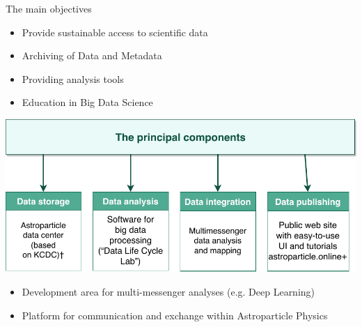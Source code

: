 

\begin{frame}{The main objectives}
\begin{minipage}[c]{0.45\textwidth}
  \begin{itemize}
    \item  Provide sustainable access to scientific data
    \item  Archiving of Data and Metadata
    \item  Providing analysis tools
    \item  Education in Big Data Science
  \end{itemize}
\end{minipage}
\hfill
\begin{minipage}[c]{0.54\textwidth}
  \includegraphics[width=1\textwidth]{pics/proj_objectives.pdf}
\end{minipage}
  \vspace{-\topsep}
  \vspace{-\partopsep}
  \vspace{\itemsep}
  \vspace{\parsep}
  \begin{itemize}
    \item  Development area for multi-messenger analyses (e.g. Deep Learning)
    \item  Platform for communication and exchange within Astroparticle Physics
  \end{itemize}
\end{frame}


